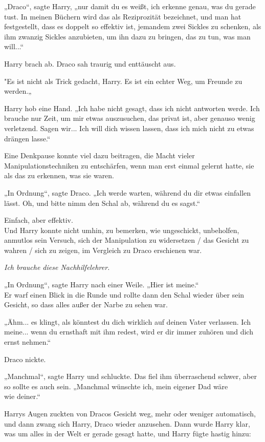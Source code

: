 {„Draco“, sagte Harry, „nur damit du es weißt, ich erkenne genau, was du gerade tust. In meinen Büchern wird das als Reziprozität bezeichnet, und man hat festgestellt, dass es doppelt so effektiv ist, jemandem zwei Sickles zu schenken, als ihm zwanzig Sickles anzubieten, um ihn dazu zu bringen, das zu tun, was man will...“

Harry brach ab. Draco sah traurig und enttäuscht aus.

"Es ist nicht als Trick gedacht, Harry. Es ist ein echter Weg, um Freunde zu werden.„

Harry hob eine Hand. „Ich habe nicht gesagt, dass ich nicht antworten werde. Ich brauche nur Zeit, um mir etwas auszusuchen, das privat ist, aber genauso wenig verletzend. Sagen wir... Ich will dich wissen lassen, dass ich mich nicht zu etwas drängen lasse.“

Eine Denkpause konnte viel dazu beitragen, die Macht vieler Manipulationstechniken zu entschärfen, wenn man erst einmal gelernt hatte, sie als das zu erkennen, was sie waren.

„In Ordnung“, sagte Draco. „Ich werde warten, während du dir etwas einfallen lässt. Oh, und bitte nimm den Schal ab, während du es sagst.“

Einfach, aber effektiv.\\ Und Harry konnte nicht umhin, zu bemerken, wie ungeschickt, unbeholfen, anmutlos sein Versuch, sich der Manipulation zu widersetzen / das Gesicht zu wahren / sich zu zeigen, im Vergleich zu Draco erschienen war.

\emph{Ich brauche diese Nachhilfelehrer.}

„In Ordnung“, sagte Harry nach einer Weile. „Hier ist meine.“\\ Er warf einen Blick in die Runde und rollte dann den Schal wieder über sein Gesicht, so dass alles außer der Narbe zu sehen war.

„Ähm... es klingt, als könntest du dich wirklich auf deinen Vater verlassen. Ich meine... wenn du ernsthaft mit ihm redest, wird er dir immer zuhören und dich ernst nehmen.“

Draco nickte.

„Manchmal“, sagte Harry und schluckte. Das fiel ihm überraschend schwer, aber so sollte es auch sein. „Manchmal wünschte ich, mein eigener Dad wäre\\ wie deiner.“

Harrys Augen zuckten von Dracos Gesicht weg, mehr oder weniger automatisch, und dann zwang sich Harry, Draco wieder anzusehen. Dann wurde Harry klar, was um alles in der Welt er gerade gesagt hatte, und Harry fügte hastig hinzu:

}
